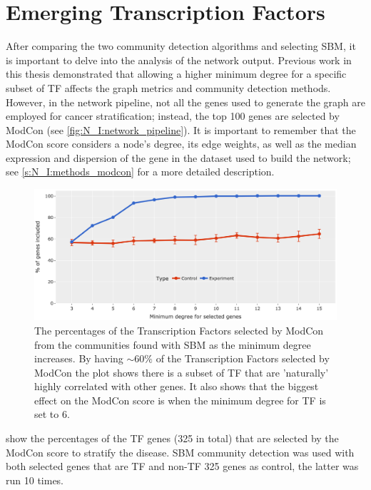 
\section{Emerging Transcription Factors} \label{s:N_I:sel_tfs}

After comparing the two community detection algorithms and selecting SBM, it is important to delve into the analysis of the network output. Previous work in this thesis demonstrated that allowing a higher minimum degree for a specific subset of TF affects the graph metrics and community detection methods. However, in the network pipeline, not all the genes used to generate the graph are employed for cancer stratification; instead, the top 100 genes are selected by ModCon (see \cref{fig:N_I:network_pipeline}). It is important to remember that the ModCon score considers a node’s degree, its edge weights, as well as the median expression and dispersion of the gene in the dataset used to build the network; see \cref{s:N_I:methods_modcon} for a more detailed description.


\begin{figure}[!b]   
    \centering
    \includegraphics[width=1.0\textwidth,height=1.0\textheight,keepaspectratio]{Sections/Network_I/Resources/selective_pruning/com_comp/ctrls_min_dig_mev.png}
      \caption[Community detection performance in selective edge pruning]{The percentages of the Transcription Factors selected by ModCon from the communities found with \gls{SBM} as the minimum degree increases. By having $\sim60\%$ of the Transcription Factors selected by ModCon the plot shows there is a subset of TF that are 'naturally' highly correlated with other genes. It also shows that the biggest effect on the ModCon score is when the minimum degree for TF is set to 6.}
    \label{fig:N_I:sel_tfs}
\end{figure}

 show the percentages of the TF genes (325 in total) that are selected by the ModCon score to stratify the disease. SBM community detection was used with both selected genes that are TF and non-TF 325 genes as control, the latter was run 10 times.

